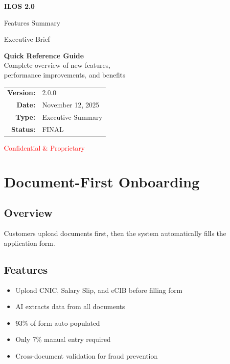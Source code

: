 \documentclass[11pt,a4paper]{article}
\begin{document}
\begin{titlepage}
    \centering
    \vspace*{1.5cm}
    {\Huge\bfseries ILOS 2.0\par}
    \vspace{0.5cm}
    {\LARGE Features Summary\par}
    \vspace{0.3cm}
    {\large Executive Brief\par}
    \vspace{1.5cm}
    
    \begin{tcolorbox}[colback=highlightcolor,colframe=tealcolor,width=0.8\textwidth,arc=3mm]
    \centering
    \large
    \textbf{Quick Reference Guide}\\[0.3cm]
    Complete overview of new features,\\
    performance improvements, and benefits
    \end{tcolorbox}
    
    \vfill
    
    \begin{tabular}{rl}
    \textbf{Version:} & 2.0.0 \\
    \textbf{Date:} & November 12, 2025 \\
    \textbf{Type:} & Executive Summary \\
    \textbf{Status:} & FINAL \\
    \end{tabular}
    
    \vspace{1cm}
    {\large\textcolor{red}{Confidential \& Proprietary}\par}
\end{titlepage}

\tableofcontents
\newpage

\section{Document-First Onboarding}

\subsection{Overview}
Customers upload documents first, then the system automatically fills the application form.

\subsection{Features}
\begin{itemize}[leftmargin=*]
    \item Upload CNIC, Salary Slip, and eCIB before filling form
    \item AI extracts data from all documents
    \item 93\% of form auto-populated
    \item Only 7\% manual entry required
    \item Cross-document validation for fraud prevention
\end{itemize}
\end{document}
